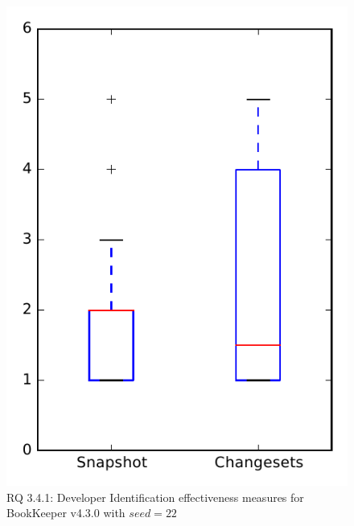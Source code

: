 
\begin{figure}
\centering
\includegraphics[height=0.4\textheight]{figures/dit_seed/rq1_bookkeeper_22}
\caption{RQ 3.4.1: Developer Identification effectiveness measures for BookKeeper v4.3.0 with $seed=22$}
\label{fig:dit_seed:rq1:bookkeeper}
\end{figure}
